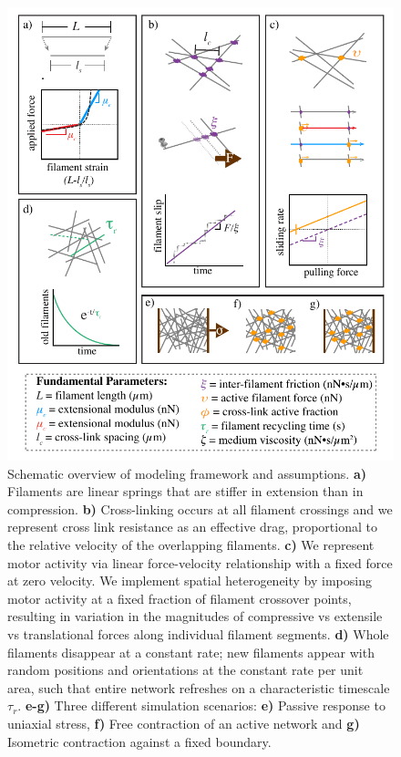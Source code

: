 \documentclass[10pt,letterpaper]{article}
\begin{document}
\begin{figure}[h!]
\centering
\includegraphics[width=\hsize]{figures/figure1}
\caption{\label{fig:model_overview} Schematic overview of modeling framework and assumptions. \textbf{a)} Filaments are linear springs that are stiffer in extension than in compression. \textbf{b)} Cross-linking occurs at all filament crossings and we represent cross link resistance as an effective drag, proportional to the relative velocity of the overlapping filaments. \textbf{c)} We represent motor activity via linear force-velocity relationship with a fixed force at zero velocity. We implement spatial heterogeneity by imposing motor activity at a fixed fraction of filament crossover points, resulting in variation in the magnitudes of compressive vs extensile vs translational forces along individual filament segments. \textbf{d)} Whole filaments disappear at a constant rate; new filaments appear with random positions and orientations at the constant rate per unit area, such that entire network refreshes on a characteristic timescale $\tau_r$. \textbf{e-g)} Three different simulation scenarios: \textbf{e)} Passive response to uniaxial stress, \textbf{f)} Free contraction of an active network and \textbf{g)} Isometric contraction against a fixed boundary. }
\end{figure}
\end{document}
